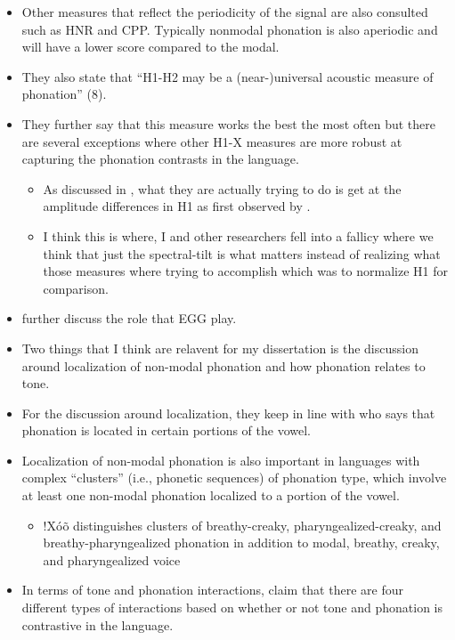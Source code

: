 \begin{itemize}
\begin{itemize}
    \end{itemize} 
    \item Other measures that reflect the periodicity of the signal are also consulted such as HNR and CPP. Typically nonmodal phonation is also aperiodic and will have a lower score compared to the modal. 
    \item They also state that ``H1-H2 may be a (near-)universal acoustic measure of phonation'' (8).
    \item They further say that this measure works the best the most often but there are several exceptions where other H1-X measures are more robust at capturing the phonation contrasts in the language. 
    \begin{itemize}
        \item As discussed in \citet{chaiH1H2AcousticMeasure2022}, what they are actually trying to do is get at the amplitude differences in H1 as first observed by \citet{fischer-jorgensenPhoneticAnalysisBreathy1968,laverVoiceQualityIndexical1968}.
        \item I think this is where, I and other researchers fell into a fallicy where we think that just the spectral-tilt is what matters instead of realizing what those measures where trying to accomplish which was to normalize H1 for comparison. 
    \end{itemize}
    \item \citet{espositoCrosslinguisticPatternsPhonation2020} further discuss the role that EGG play. 
    \item Two things that I think are relavent for my dissertation is the discussion around localization of non-modal phonation and how phonation relates to tone. 
    \item For the discussion around localization, they keep in line with \citet{silvermanLaryngealComplexityOtomanguean1997} who says that phonation is located in certain portions of the vowel. 
    \item Localization of non-modal phonation is also important in languages with complex ``clusters'' (i.e., phonetic sequences) of phonation type, which involve at least one non-modal phonation localized to a portion of the vowel. 
    \begin{itemize}
        \item !Xóõ distinguishes clusters of breathy-creaky, pharyngealized-creaky, and breathy-pharyngealized phonation in addition to modal, breathy, creaky, and pharyngealized voice
    \end{itemize}
    \item In terms of tone and phonation interactions, \citet{espositoCrosslinguisticPatternsPhonation2020} claim that there are four different types of interactions based on whether or not tone and phonation is contrastive in the language. 

\end{itemize}
